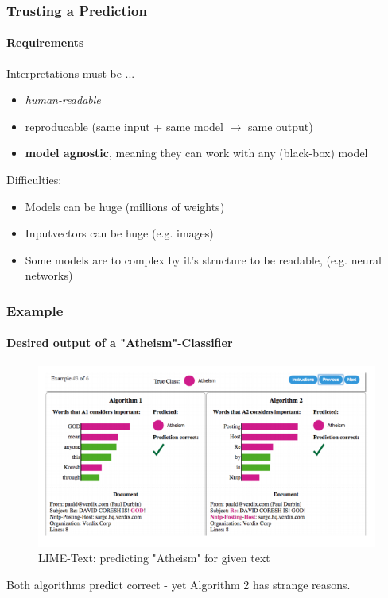 \begin{frame}
	\frametitle{Trusting a Prediction}
	\framesubtitle{Requirements}
	
	Interpretations must be ...
	\begin{itemize}
		\item \textit{human-readable}
		\item reproducable (same input + same model $\rightarrow$ same output)
		\item \textbf{model agnostic}, meaning they can work with any (black-box) model
	\end{itemize}
	
	Difficulties:
	\begin{itemize}
		\item Models can be huge (millions of weights)
		\item Inputvectors can be huge (e.g. images)
		\item Some models are to complex by it's structure to be readable, \newline (e.g. neural networks)
	\end{itemize}
\end{frame}

\begin{frame}
	\frametitle{Example}
	\framesubtitle{Desired output of a "Atheism"-Classifier}
	\begin{figure}
		\centering
		\includegraphics[width=0.9\linewidth]{Images/AtheismExample}
		\caption[LIME-Text-Example]{LIME-Text: predicting "Atheism" for given text }
		\label{fig:atheismexample}
	\end{figure}
	\begin{center}
		Both algorithms predict correct - yet Algorithm 2 has strange reasons.
	\end{center}
\end{frame}

